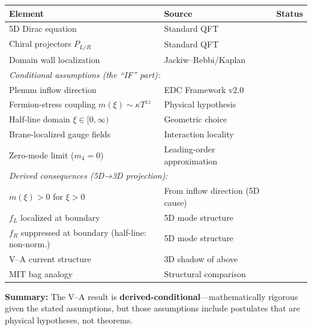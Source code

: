 \begin{tcolorbox}[colback=green!5, colframe=green!50!black,
    title=\textbf{Epistemic Audit}]
\begin{center}
\small
\begin{tabular}{lll}
\toprule
\textbf{Element} & \textbf{Source} & \textbf{Status} \\
\midrule
5D Dirac equation & Standard QFT & \tagBL{} \\
Chiral projectors $P_{L/R}$ & Standard QFT & \tagBL{} \\
Domain wall localization & Jackiw--Rebbi/Kaplan~\cite{JackiwRebbi1976,Kaplan1992} & \tagBL{} \\
\midrule
\multicolumn{3}{l}{\textit{Conditional assumptions (the ``IF'' part):}} \\
Plenum inflow direction & EDC Framework v2.0 & \tagP{} \\
Fermion-stress coupling $m(\xi) \sim \kappa T^{zz}$ & Physical hypothesis & \tagP{} \\
Half-line domain $\xi \in [0, \infty)$ & Geometric choice & \tagP{} \\
Brane-localized gauge fields & Interaction locality & \tagP{} \\
Zero-mode limit ($m_4 = 0$) & Leading-order approximation & \tagP{} \\
\midrule
\multicolumn{3}{l}{\textit{Derived consequences (5D→3D projection):}} \\
$m(\xi) > 0$ for $\xi > 0$ & From inflow direction (5D cause) & \tagDc{} \\
$f_L$ localized at boundary & 5D mode structure & \tagDc{} \\
$f_R$ suppressed at boundary (half-line: non-norm.) & 5D mode structure & \tagDc{} \\
V–A current structure & 3D shadow of above & \tagDc{} \\
\midrule
MIT bag analogy & Structural comparison & \tagI{} \\
\bottomrule
\end{tabular}
\end{center}
\medskip
\noindent\textbf{Summary:} The V--A result is \textbf{derived-conditional}---mathematically
rigorous given the stated assumptions, but those assumptions include postulates \tagP{}
that are physical hypotheses, not theorems.
\end{tcolorbox}

